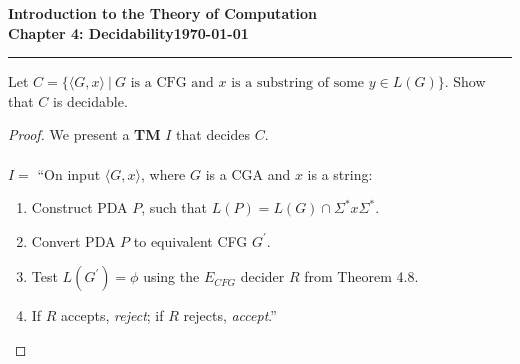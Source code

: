 \documentclass[11pt]{article}
\newcommand{\dated}{\today}
\begin{document}
\textbf{Introduction to the Theory of
Computation}\hfill\textbf{\myname}\\[0.01in]
\textbf{Chapter 4: Decidability}\hfill\textbf{\dated}\\
\smallskip\hrule\bigskip

\begin{problem}{4.28}
Let $C = \{\langle G, x \rangle \ | \ G \text{ is a CFG and } x \text{ is a substring of some } y \in L(G)\}$. Show that $C$ is decidable.
\end{problem}

\begin{proof}
We present a \textbf{TM} $I$ that decides $C$.  \\
\\
$I =$ \textquotedblleft On input $\langle G, x \rangle$, where $G$ is a CGA and $x$ is a string:
\begin{enumerate}
\item Construct PDA $P$, such that $L(P) = L(G) \cap \Sigma^{*}x\Sigma^{*}$.
\item Convert PDA $P$ to equivalent CFG $G^{'}$.
\item Test $L(G^{'}) = \phi$ using the $E_{CFG}$ decider $R$ from Theorem 4.8.
\item If $R$ accepts, \textit{reject}; if $R$ rejects, \textit{accept}.\textquotedblright
\end{enumerate}
\end{proof}
\end{document}

